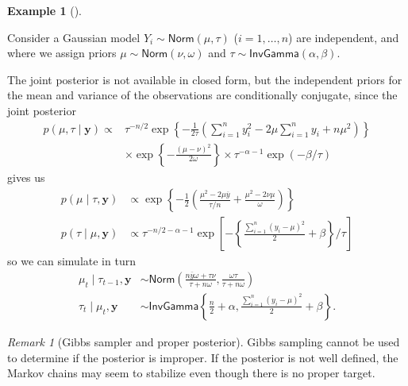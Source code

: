 \documentclass[
  11pt,
  letterpaper,
]{scrbook}
\theoremstyle{definition}
\newtheorem{example}{Example}[chapter]
\theoremstyle{definition}
\theoremstyle{definition}
\theoremstyle{plain}
\theoremstyle{remark}
\newtheorem*{remark}{Remark}
\begin{document}
\begin{example}[]\protect\hypertarget{exm-gaussian-gamma}{}\label{exm-gaussian-gamma}

Consider a Gaussian model \(Y_i \sim \mathsf{Norm}(\mu, \tau)\)
(\(i=1, \ldots, n\)) are independent, and where we assign priors
\(\mu \sim \mathsf{Norm}(\nu, \omega)\) and
\(\tau \sim \mathsf{InvGamma}(\alpha, \beta)\).

The joint posterior is not available in closed form, but the independent
priors for the mean and variance of the observations are conditionally
conjugate, since the joint posterior \begin{align*}
p(\mu, \tau \mid \boldsymbol{y}) \propto& \tau^{-n/2}\exp\left\{-\frac{1}{2\tau}\left(\sum_{i=1}^n y_i^2 - 2\mu \sum_{i=1}^n y_i+n\mu^2 \right)\right\}\\& \times \exp\left\{-\frac{(\mu-\nu)^2}{2\omega}\right\} \times \tau^{-\alpha-1}\exp(-\beta/\tau)
\end{align*} gives us \begin{align*}
p(\mu \mid \tau, \boldsymbol{y}) &\propto \exp\left\{-\frac{1}{2} \left( \frac{\mu^2-2\mu\overline{y}}{\tau/n} + \frac{\mu^2-2\nu \mu}{\omega}\right)\right\}\\
p(\tau \mid \mu, \boldsymbol{y}) & \propto \tau^{-n/2-\alpha-1}\exp\left[-\left\{\frac{\sum_{i=1}^n (y_i-\mu)^2}{2} + \beta \right\}/\tau\right]
\end{align*} so we can simulate in turn \begin{align*}
\mu_t \mid \tau_{t-1}, \boldsymbol{y} &\sim \mathsf{Norm}\left(\frac{n\overline{y}\omega+\tau \nu}{\tau + n\omega}, \frac{\omega \tau}{\tau + n\omega}\right)\\
\tau_t \mid \mu_t, \boldsymbol{y} &\sim \mathsf{InvGamma}\left\{\frac{n}{2}+\alpha, \frac{\sum_{i=1}^n (y_i-\mu)^2}{2} + \beta\right\}.
\end{align*}

\end{example}

\begin{remark}[Gibbs sampler and proper posterior]

Gibbs sampling cannot be used to determine if the posterior is improper.
If the posterior is not well defined, the Markov chains may seem to
stabilize even though there is no proper target.

\end{remark}
\end{document}
